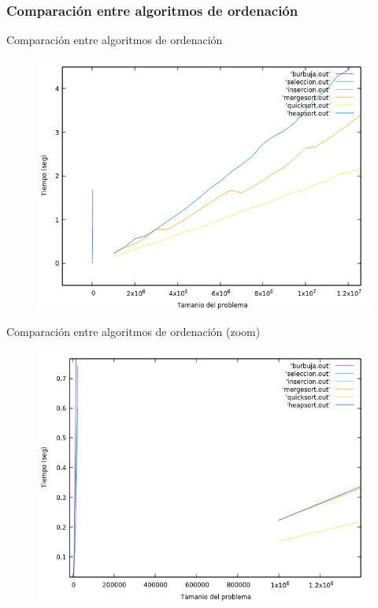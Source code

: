 \documentclass{beamer}
\begin{document}
\subsubsection{Comparación entre algoritmos de ordenación}

\begin{frame}[fragile]{Comparación entre algoritmos de ordenación}
\begin{figure}[H]
\centering
\includegraphics[scale=0.5]{empirica_ordenacion_comparacion.png}
\end{figure}
\end{frame}

\begin{frame}[fragile]{Comparación entre algoritmos de ordenación (zoom)}
\begin{figure}[H]
\centering
\includegraphics[scale=0.5]{empirica_ordenacion_comparacion_zoom.png}
\end{figure}
\end{frame}
\end{document}
